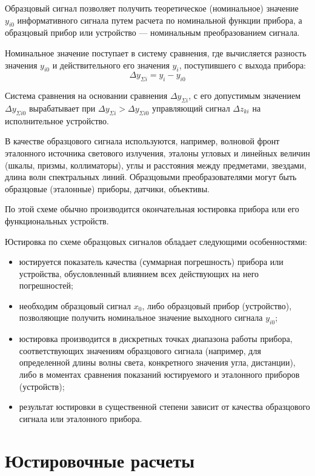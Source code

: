 Образцовый сигнал позволяет получить теоретическое (номинальное) значение $ y_{i0} $ информативного сигнала путем расчета по номинальной функции прибора, а образцовый прибор или устройство --- номинальным преобразованием сигнала.

Номинальное значение поступает в систему сравнения, где вычисляется разность значения $ y_{i0} $ и действительного его значения $ y_i $, поступившего с выхода прибора:
\[ \Delta y_{\Sigma i} = y_i - y_{i0} \]

Система сравнения на основании сравнения $ \Delta y_{\Sigma i} $, с его допустимым значением $ \Delta y_{\Sigma i0} $ вырабатывает при $ \Delta y_{\Sigma i} > \Delta y_{\Sigma i0} $ управляющий сигнал $ \Delta z_{ki} $ на исполнительное устройство.

В качестве образцового сигнала используются, например, волновой фронт эталонного источника светового излучения, эталоны угловых и линейных величин (шкалы, призмы, коллиматоры), углы и расстояния между предметами, звездами, длина волн спектральных линий. Образцовыми преобразователями могут быть образцовые (эталонные) приборы, датчики, объективы.

По этой схеме обычно производится окончательная юстировка прибора или его функциональных устройств. 

Юстировка по схеме образцовых сигналов обладает следующими особенностями:
\begin{itemize}
	\item юстируется показатель качества (суммарная погрешность) прибора или устройства, обусловленный влиянием всех действующих на него погрешностей;
	\item необходим образцовый сигнал $ x_0 $,  либо образцовый прибор (устройство), позволяющие получить номинальное значение выходного сигнала $ y_{i0} $; 
	\item юстировка производится в дискретных точках диапазона работы прибора, соответствующих значениям образцового сигнала (например, для определенной длины волны света, конкретного значения угла, дистанции), либо в моментах сравнения показаний юстируемого и эталонного приборов (устройств);
	\item результат юстировки в существенной степени зависит от качества образцового сигнала или эталонного прибора.
\end{itemize}

\section{Юстировочные расчеты}

